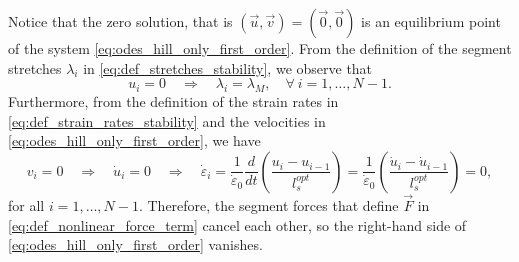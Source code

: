 \documentclass{sfuthesis}
\numberwithin{equation}{section}
\numberwithin{figure}{chapter}
\numberwithin{table}{chapter}
\theoremstyle{definition}
\newcommand{\depsilon}{\dot{\varepsilon}}
\begin{document}
Notice that the zero solution, that is $(\vec{u}, \vec{v}) = (\vec{0}, \vec{0})$ is an equilibrium point of the system \eqref{eq:odes_hill_only_first_order}. From the definition of the segment stretches $\lambda_i$ in \eqref{eq:def_stretches_stability}, we observe that
\[
u_i = 0 \quad \Rightarrow \quad \lambda_i = \lambda_M, \quad \forall \ i=1,\dots,N-1.
\]
Furthermore, from the definition of the strain rates in \eqref{eq:def_strain_rates_stability} and the velocities in \eqref{eq:odes_hill_only_first_order}, we have
\[
v_i = 0 \quad \Rightarrow \quad \dot{u}_i = 0 \quad \Rightarrow \quad\depsilon_i = \dfrac{1}{\depsilon_0} \dfrac{d}{dt} \left( \dfrac{u_i - u_{i-1}}{l_s^{opt}} \right) = \dfrac{1}{\depsilon_0} \left( \dfrac{\dot{u}_i - \dot{u}_{i-1}}{l_s^{opt}} \right) = 0,
\]
for all $i=1,\dots,N-1$. Therefore, the segment forces that define $\vec{F}$ in \eqref{eq:def_nonlinear_force_term} cancel each other, so the right-hand side of \eqref{eq:odes_hill_only_first_order} vanishes. 
\end{document}

